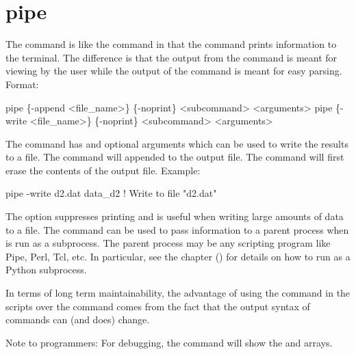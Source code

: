 \section{pipe}
\label{s:pipe}

The  command is like the  command in that the  command prints
information to the terminal. The difference is that the output from the  command is meant
for viewing by the user while the output of the  command is meant for easy
parsing. Format:
\begin{example}
  pipe \{-append <file_name>\} \{-noprint\} <subcommand> <arguments>
  pipe \{-write <file_name>\} \{-noprint\} <subcommand> <arguments>
\end{example}

The  command has  and  optional arguments which can be used to
write the results to a file. The  command will appended to the output file. The
 command will first erase the contents of the output file. Example:
\begin{example}
  pipe -write d2.dat data_d2    ! Write to file "d2.dat"
\end{example}

The  option suppresses printing and is useful when writing large amounts of data to a
file.  The  command can be used to pass information to a parent process when \tao is run
as a subprocess.  The parent process may be any scripting program like Pipe, Perl, Tcl, etc.  In
particular, see the  chapter () for details on how to run
\tao as a Python subprocess.

In terms of long term maintainability, the advantage of using the  command in the scripts
over the  command comes from the fact that the output syntax of  commands can (and
does) change.

Note to programmers: For debugging, the  command will show the 
and  arrays.

